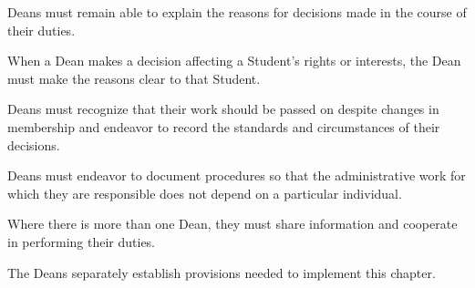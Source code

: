 \begin{articles}
  \item Deans must remain able to explain the reasons for decisions made in the course of their duties.
  \begin{paragraphs}
    \item When a Dean makes a decision affecting a Student's rights or interests, the Dean must make the reasons clear to that Student.
  \end{paragraphs}
  \item Deans must recognize that their work should be passed on despite changes in membership and endeavor to record the standards and circumstances of their decisions.
  \begin{paragraphs}
    \item Deans must endeavor to document procedures so that the administrative work for which they are responsible does not depend on a particular individual.
  \end{paragraphs}
  \item Where there is more than one Dean, they must share information and cooperate in performing their duties.
  \item The Deans separately establish provisions needed to implement this chapter.
\end{articles}
